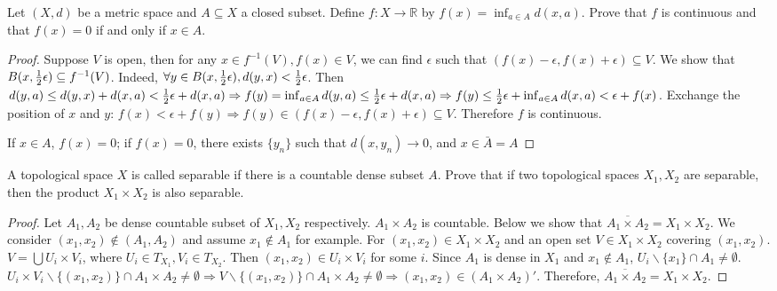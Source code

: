 \begin{problem}
Let $(X,d)$ be a metric space and $A\subseteq X$ a closed subset. Define $f:  X\to \mathbb{R}$ by $f(x) = \inf_{a\in A} d(x,a)$. Prove that $f$ is continuous and that $f(x)=0$ if and only if $x\in A$.
\end{problem}
\begin{solution}
\begin{proof}
Suppose $V$ is open, then for any $x\in f^{-1}(V),f(x)\in V$, we can find $\epsilon$ such that $(f(x)-\epsilon,f(x)+\epsilon)\subseteq V$.
We show that $B(x,{1\over 2}\epsilon) \subseteq f^{-1}(V)$. Indeed, $\forall y \in B(x,{1\over 2}\epsilon),d(y,x)<{1 \over 2}\epsilon$. Then $d(y,a)\leq d(y,x)+d(x,a)<{1 \over 2}\epsilon+d(x,a) \Rightarrow f(y)=\inf_{a\in A}d(y,a)\leq {1\over 2}\epsilon+d(x,a) \Rightarrow f(y)\leq {1\over 2}\epsilon+\inf_{a\in A}d(x,a)<\epsilon+f(x)$. Exchange the position of $x$ and $y$: $f(x)< \epsilon+f(y) \Rightarrow f(y)\in (f(x)-\epsilon,f(x)+\epsilon)\subseteq V$.
Therefore $f$ is continuous.

If $x\in A$, $f(x)=0$; if $f(x)=0$, there exists $\{y_n\}$ such that $d(x,y_n)\to 0$, and $x\in \bar{A}=A$
\end{proof}
\end{solution}

\begin{problem}
A topological space $X$ is called separable if there is a countable dense subset $A$. Prove that if two topological spaces $X_1,X_2$ are separable, then the product $X_1\times X_2$ is also separable.
\end{problem}
\begin{solution}
\begin{proof}
Let $A_1,A_2$ be dense countable subset of $X_1,X_2$ respectively. $A_1\times A_2$ is countable. Below we show that $\overline{A_1\times A_2}=X_1\times X_2$.
We consider $(x_1,x_2) \notin (A_1,A_2)$ and assume $x_1\notin A_1$ for example. For $(x_1,x_2)\in X_1\times X_2$ and an open set $V\in X_1\times X_2$ covering $(x_1,x_2)$. $V=\bigcup U_i\times V_i$, where $U_i\in T_{X_1},V_i \in T_{X_2}$. Then $(x_1,x_2)\in U_i\times V_i$ for some $i$. Since $A_1$ is dense in $X_1$ and $x_1\notin A_1$, $U_i\backslash\{x_1\}\cap A_1\neq \emptyset$. $U_i\times V_i\backslash\{(x_1,x_2)\}\cap A_1\times A_2 \neq \emptyset\Rightarrow V\backslash\{(x_1,x_2)\}\cap A_1\times A_2 \neq \emptyset\Rightarrow (x_1,x_2)\in (A_1\times A_2)'$. Therefore,  $\overline{A_1\times A_2}=X_1\times X_2$.
\end{proof}
\end{solution}
